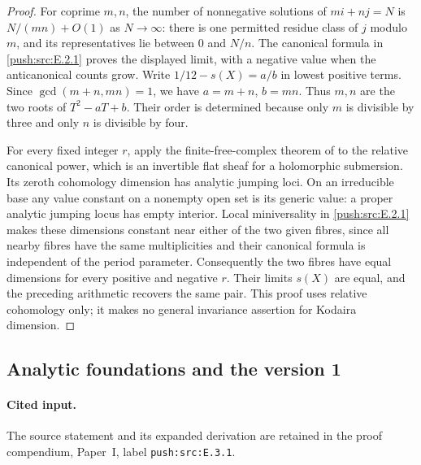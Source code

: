 \begin{proof}
For coprime $m,n$, the number of nonnegative solutions of
$mi+nj=N$ is $N/(mn)+O(1)$ as $N\to\infty$:
there is one permitted residue class of $j$ modulo $m$, and
its representatives lie between $0$ and $N/n$.
The canonical formula in \ref{push:src:E.2.1} proves the displayed limit,
with a negative value when the anticanonical counts grow.
Write $1/12-s(X)=a/b$ in lowest positive terms.
Since $\gcd(m+n,mn)=1$, we have $a=m+n$, $b=mn$.
Thus $m,n$ are the two roots of $T^2-aT+b$.
Their order is determined because only $m$ is divisible by
three and only $n$ is divisible by four.

For every fixed integer $r$, apply the finite-free-complex
theorem of \cite[Chapter III, Theorem 4.1]{BS76} to
the relative canonical power, which is an invertible flat
sheaf for a holomorphic submersion.  Its zeroth cohomology
dimension has analytic jumping loci.  On an irreducible
base any value constant on a nonempty open set is its
generic value: a proper analytic jumping locus has empty
interior.  Local miniversality in \ref{push:src:E.2.1} makes these dimensions
constant near either of the two given fibres, since all
nearby fibres have the same multiplicities and their
canonical formula is independent of the period parameter.
Consequently the two fibres have equal dimensions for
every positive and negative $r$.  Their limits $s(X)$
are equal, and the preceding arithmetic recovers the same
pair.  This proof uses relative cohomology only; it makes
no general invariance assertion for Kodaira dimension.
\end{proof}

\subsection{Analytic foundations and the version 1}\label{push:section:E.3}

\paragraph{Cited input.} \label{push:src:E.3.1}The source statement and its expanded derivation are retained in the proof compendium, Paper~I, label \nolinkurl{push:src:E.3.1}.\par




